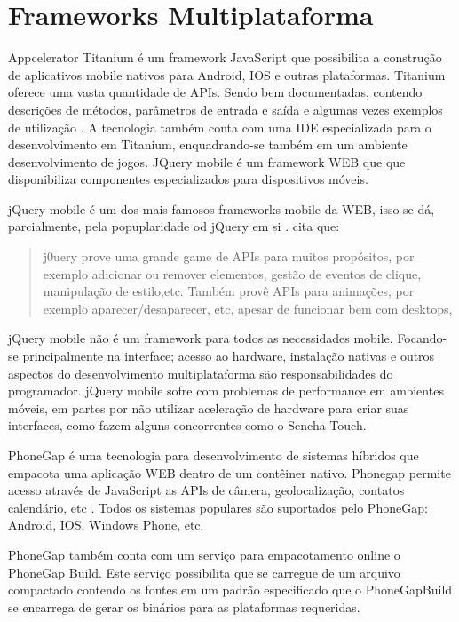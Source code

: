 \section{Frameworks Multiplataforma}

Appcelerator Titanium é um framework JavaScript que possibilita a
construção de aplicativos mobile nativos para Android, IOS e outras
plataformas. Titanium oferece uma vasta quantidade de APIs. Sendo
bem documentadas, contendo descrições de métodos, parâmetros de
entrada e saída e algumas vezes exemplos de utilização \autocite[pp.
2]{crossPlatformAppsAnimations}. A tecnologia também conta com uma IDE
especializada para o desenvolvimento em Titanium, enquadrando-se também
em um ambiente desenvolvimento de jogos. JQuery mobile é um framework
WEB que que disponibiliza componentes especializados para dispositivos
móveis.


jQuery mobile é um dos mais famosos frameworks mobile da WEB, isso 
se dá, parcialmente, pela popuplaridade od jQuery em si \autocite[pp. 14]{viabilityBusinessApplications}.
\autocite[pp. 2]{crossPlatformAppsAnimations} cita que:
\begin{quote}
j0uery prove uma grande game de APIs para muitos propósitos, por
exemplo adicionar ou remover elementos, gestão de eventos de clique,
manipulação de estilo,etc. Também provê APIs para animações, por
exemplo aparecer/desaparecer, etc, apesar de funcionar bem com desktops,
\end{quote}

jQuery mobile não é um framework para todos as necessidades mobile.
Focando-se principalmente na interface; acesso ao hardware, instalação
nativas e outros aspectos do desenvolvimento multiplataforma
são responsabilidades do programador. jQuery mobile sofre com
problemas de performance em ambientes móveis, em partes por não
utilizar aceleração de hardware para criar suas interfaces,
como fazem alguns concorrentes como o Sencha Touch\autocite[pp.
14]{viabilityBusinessApplications}.

PhoneGap é uma tecnologia para desenvolvimento de sistemas híbridos 
que empacota uma aplicação WEB dentro de um contêiner nativo. Phonegap 
permite acesso através de JavaScript as APIs de câmera, geolocalização,
contatos calendário, etc \autocite[pp. 3]{crossPlatformAppsAnimations}.
Todos os sistemas populares são suportados pelo PhoneGap: Android, IOS, 
Windows Phone, etc.

PhoneGap também conta com um serviço para empacotamento online
o PhoneGap Build. Este serviço possibilita que se carregue de um
arquivo compactado contendo os fontes em um padrão especificado 
que o PhoneGapBuild  se encarrega de gerar os binários para as 
plataformas requeridas.

